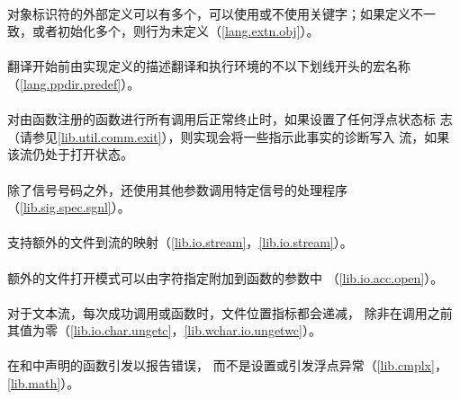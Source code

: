 \paragraph{}
对象标识符的外部定义可以有多个，可以使用或不使用关键字；如果定义不一
致，或者初始化多个，则行为未定义（\ref{lang.extn.obj}）。

\paragraph{}
翻译开始前由实现定义的描述翻译和执行环境的不以下划线开头的宏名称
（\ref{lang.ppdir.predef}）。

\paragraph{}
对由函数注册的函数进行所有调用后正常终止时，如果设置了任何浮点状态标
志（请参见\ref{lib.util.comm.exit}），则实现会将一些指示此事实的诊断写入
流，如果该流仍处于打开状态。

\paragraph{}
除了信号号码之外，还使用其他参数调用特定信号的处理程序
（\ref{lib.sig.spec.sgnl}）。

\paragraph{}
支持额外的文件到流的映射（\ref{lib.io.stream}，\ref{lib.io.stream}）。

\paragraph{}
额外的文件打开模式可以由字符指定附加到函数的参数中
（\ref{lib.io.acc.open}）。

\paragraph{}
对于文本流，每次成功调用或函数时，文件位置指标都会递减，
除非在调用之前其值为零（\ref{lib.io.char.ungetc}，\ref{lib.wchar.io.ungetwc}）。

\paragraph{}
在和中声明的函数引发以报告错误，
而不是设置或引发浮点异常（\ref{lib.cmplx}，\ref{lib.math}）。
